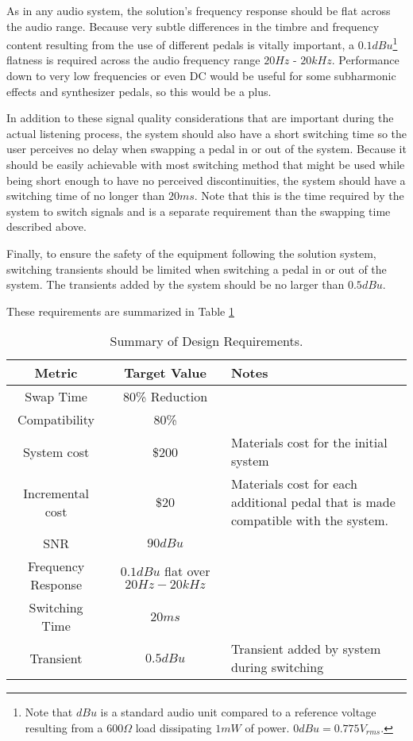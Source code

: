 As in any audio system, the solution's frequency response should be flat across the audio range.  Because very subtle differences in the timbre and frequency content resulting from the use of different pedals is vitally important, a $0.1dBu$\footnote{Note that $dBu$ is a standard audio unit compared to a reference voltage resulting from a $600\Omega$ load dissipating $1mW$ of power.  $0dBu = 0.775V_{rms}$.} flatness is required across the audio frequency range $20Hz$ - $20kHz$.  Performance down to very low frequencies or even DC would be useful for some subharmonic effects and synthesizer pedals, so this would be a plus.

In addition to these signal quality considerations that are important during the actual listening process, the system should also have a short switching time so the user perceives no delay when swapping a pedal in or out of the system.  Because it should be easily achievable with most switching method that might be used while being short enough to have no perceived discontinuities, the system should have a switching time of no longer than $20ms$.  Note that this is the time required by the system to switch signals and is a separate requirement than the swapping time described above.

Finally, to ensure the safety of the equipment following the solution system, switching transients should be limited when switching a pedal in or out of the system.  The transients added by the system should be no larger than $0.5dBu$.

These requirements are summarized in Table \ref{tab:requirements}

	\begin{table}
	\begin{center}
	\captionsetup{justification=centering}
	\caption{Summary of Design Requirements.}
	\renewcommand{\arraystretch}{2}
	\raggedbottom
	\begin{tabular}{|c|c|p{2in}|}
		\hline
		Metric & Target Value & Notes \\
		\hline
		Swap Time 			& 80\% Reduction 	&	\\
		Compatibility 		& 80\%	 		 	&	\\
		System cost 		& \$200				& Materials cost for the initial system	\\
		Incremental cost 	& \$20 				& Materials cost for each additional pedal that is made compatible with the system. \\
		SNR 				& $90dBu$ 			& 	\\
		Frequency Response  & $0.1dBu$ flat over $20Hz - 20kHz$ 	& \\
		Switching Time 		& $20ms$ 			& \\
		Transient 			& $0.5dBu$ 			& Transient added by system during switching \\
		\hline
	\end{tabular}
	\label{tab:requirements}
	\end{center}
	\end{table}